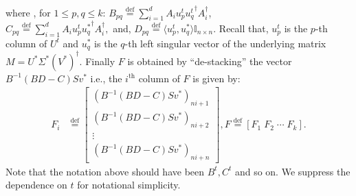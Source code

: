 \documentclass[11pt]{article}
\renewcommand{\eqref}[1]{\hyperref[#1]{(\ref*{#1})}}
\theoremstyle{plain}
\theoremstyle{definition}
\newcommand{\iprod}[2]{\langle #1, #2 \rangle}
\newcommand{\eqdef}{\stackrel{\textrm{def}}{=}}
\begin{document}
where , for $1\leq p,q\leq k$: $B_{pq} \eqdef \sum_{i=1}^d A_i u_p^{t}{u_q^{t}}^\dag  A_i^\dag $,\\ $C_{pq} \eqdef \sum_{i=1}^d A_i u_p^{t}{u_q^*}^\dag  A_i^\dag, $ and, $D_{pq} \eqdef \iprod{u_p^{t}}{u_q^*}\mathbb{I}_{n\times n}.$ Recall that, $ u_p^{t}$ is the $p$-th column of $U^{t}$ and $u_q^*$ is the $q$-th left singular vector of the underlying matrix $M=U^*\Sigma^* (V^*)^\dag$. 
Finally $F$ is obtained by ``de-stacking'' the vector\\ $B^{-1}\left(BD-C\right)Sv^*$ i.e., the $i^{\textrm{th}}$ column of $F$ is given by:{\small
\begin{align}
  F_i&\eqdef\left[\begin{matrix} \left(B^{-1}\left(BD-C\right)Sv^*\right)_{ni+1} \\ \left(B^{-1}\left(BD-C\right)Sv^*\right)_{ni+2} \\ \vdots \\ \left(B^{-1}\left(BD-C\right)Sv^*\right)_{ni+n}
            \end{matrix}\right], F \eqdef \left[F_1 \; F_2 \;\cdots \;F_k \right]. \label{eq:F_k}
\end{align}}
Note that the notation above should have been $B^t,C^t$ and so on. We suppress the dependence on $t$ for notational simplicity. 
\end{document}
